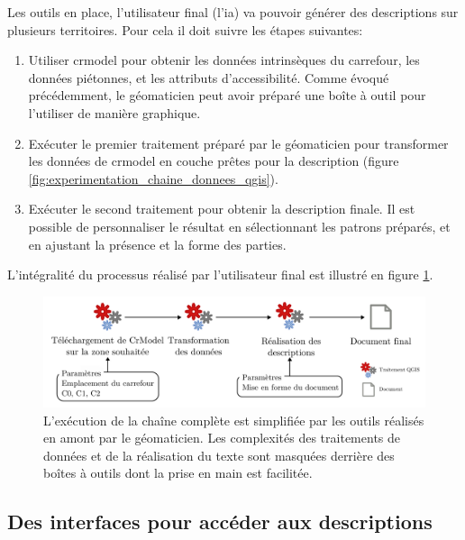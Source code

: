 Les outils en place, l'utilisateur final (l'\gls{ia}) va pouvoir générer des descriptions sur plusieurs territoires. Pour cela il doit suivre les étapes suivantes:

\begin{enumerate}
    \item Utiliser crmodel pour obtenir les données intrinsèques du carrefour, les données piétonnes, et les attributs d'accessibilité. Comme évoqué précédemment, le géomaticien peut avoir préparé une boîte à outil pour l'utiliser de manière graphique.
    \item Exécuter le premier traitement préparé par le géomaticien pour transformer les données  de crmodel en couche prêtes pour la description (figure \ref{fig:experimentation_chaine_donnees_qgis}).
    \item Exécuter le second traitement pour obtenir la description finale. Il est possible de personnaliser le résultat en sélectionnant les patrons préparés, et en ajustant la présence et la forme des parties. 
\end{enumerate}

L'intégralité du processus réalisé par l'utilisateur final est illustré en figure \ref{fig:experimentation_processus_realisation_utilisateur}.

\begin{figure}[ht]
    \centering
    \includegraphics[width=\textwidth]{images/experimentation/pipeline_utilisateur.pdf}
    \caption[Étapes d'exécution de la chaîne de description par l'utilisateur]{L'exécution de la chaîne complète est simplifiée par les outils réalisés en amont par le géomaticien. Les complexités des traitements de données et de la réalisation du texte sont masquées derrière des boîtes à outils dont la prise en main est facilitée.}
    \label{fig:experimentation_processus_realisation_utilisateur}
\end{figure}

\subsection{Des interfaces pour accéder aux descriptions}

